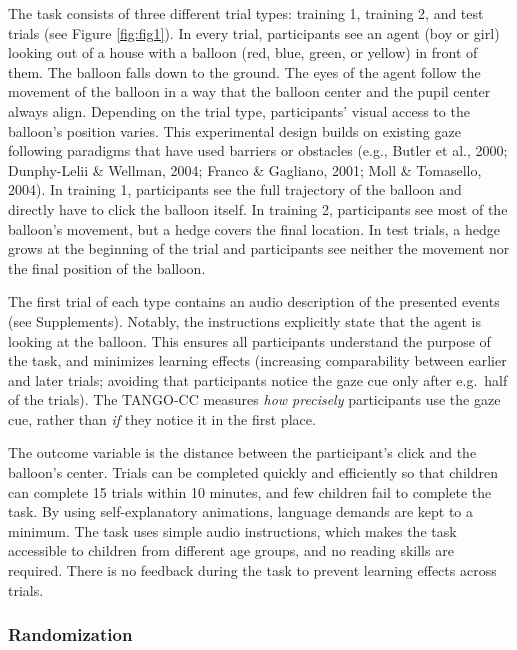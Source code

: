 \documentclass[
  man,floatsintext]{apa7}
\begin{document}
The task consists of three different trial types: training 1, training 2, and test trials (see Figure \ref{fig:fig1}).
In every trial, participants see an agent (boy or girl) looking out of a house with a balloon (red, blue, green, or yellow) in front of them.
The balloon falls down to the ground. The eyes of the agent follow the movement of the balloon in a way that the balloon center and the pupil center always align.
Depending on the trial type, participants' visual access to the balloon's position varies.
This experimental design builds on existing gaze following paradigms that have used barriers or obstacles (e.g., Butler et al., 2000; Dunphy-Lelii \& Wellman, 2004; Franco \& Gagliano, 2001; Moll \& Tomasello, 2004).
In training 1, participants see the full trajectory of the balloon and directly have to click the balloon itself.
In training 2, participants see most of the balloon's movement, but a hedge covers the final location.
In test trials, a hedge grows at the beginning of the trial and participants see neither the movement nor the final position of the balloon.

The first trial of each type contains an audio description of the presented events (see Supplements).
Notably, the instructions explicitly state that the agent is looking at the balloon.
This ensures all participants understand the purpose of the task, and minimizes learning effects (increasing comparability between earlier and later trials; avoiding that participants notice the gaze cue only after e.g.~half of the trials).
The TANGO-CC measures \emph{how precisely} participants use the gaze cue, rather than \emph{if} they notice it in the first place.

The outcome variable is the distance between the participant's click and the balloon's center.
Trials can be completed quickly and efficiently so that children can complete 15 trials within 10 minutes, and few children fail to complete the task.
By using self-explanatory animations, language demands are kept to a minimum.
The task uses simple audio instructions, which makes the task accessible to children from different age groups, and no reading skills are required.
There is no feedback during the task to prevent learning effects across trials.

\subsubsection{Randomization}\label{randomization}
\end{document}
